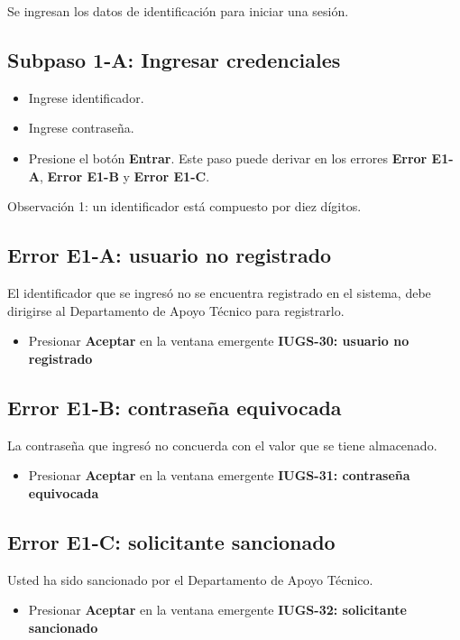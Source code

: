 Se ingresan los datos de identificación para iniciar una sesión.
\subsection{Subpaso 1-A: Ingresar credenciales}
\begin{itemize}
	\item Ingrese identificador.
	\item Ingrese contraseña.
	\item Presione el botón \textbf{Entrar}. Este paso puede derivar
		en los errores \textbf{Error E1-A}, \textbf{Error E1-B} y 
		\textbf{Error E1-C}.
\end{itemize}
Observación 1: un identificador está compuesto por diez dígitos.
	

\subsection{Error E1-A: usuario no registrado}
El identificador que se ingresó no se encuentra registrado en el sistema,
debe dirigirse al Departamento de Apoyo Técnico para registrarlo.
\begin{itemize}
	\item Presionar \textbf{Aceptar} en la ventana emergente 
		\textbf{IUGS-30: usuario no registrado}
\end{itemize}

\subsection{Error E1-B: contraseña equivocada}
La contraseña que ingresó no concuerda con el valor que se tiene almacenado.
\begin{itemize}
	\item Presionar \textbf{Aceptar} en la ventana emergente 
		\textbf{IUGS-31: contraseña equivocada}
\end{itemize}

\subsection{Error E1-C: solicitante sancionado}
Usted ha sido sancionado por el Departamento de Apoyo Técnico.
\begin{itemize}
	\item Presionar \textbf{Aceptar} en la ventana emergente 
		\textbf{IUGS-32: solicitante sancionado}
\end{itemize}